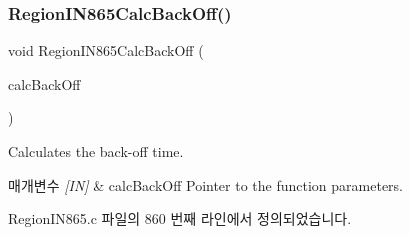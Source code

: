 \subsubsection{\texorpdfstring{Region\+I\+N865\+Calc\+Back\+Off()}{RegionIN865CalcBackOff()}}
{\footnotesize\ttfamily void Region\+I\+N865\+Calc\+Back\+Off (\begin{DoxyParamCaption}\item[{\mbox{\hyperlink{group___r_e_g_i_o_n_ga7c5c9a8da174e6679eded8257dc92fd9}{Calc\+Back\+Off\+Params\+\_\+t}} $\ast$}]{calc\+Back\+Off }\end{DoxyParamCaption})}



Calculates the back-\/off time. 


\begin{DoxyParams}{매개변수}
{\em \mbox{[}\+I\+N\mbox{]}} & calc\+Back\+Off Pointer to the function parameters. \\
\hline
\end{DoxyParams}


Region\+I\+N865.\+c 파일의 860 번째 라인에서 정의되었습니다.


